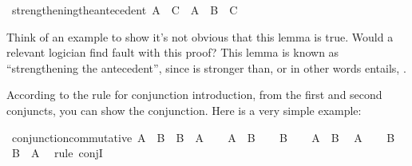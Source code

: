 \begin{isabellebody}
\begin{isamarkuptext}
\end{isamarkuptext}\isamarkuptrue%
\isamarkupfalse%
\ strengthening{\isacharunderscore}the{\isacharunderscore}antecedent{\isacharcolon}\ {\isachardoublequoteopen}{\isacharparenleft}A\ {\isasymlongrightarrow}\ C{\isacharparenright}\ {\isasymlongrightarrow}\ {\isacharparenleft}A\ {\isasymand}\ B\ {\isasymlongrightarrow}\ C{\isacharparenright}{\isachardoublequoteclose}%
\isadelimproof
\ %
\endisadelimproof
%
\isatagproof
{}\isamarkupfalse%
%
\endisatagproof
{\isafoldproof}%
%
\isadelimproof
%
\endisadelimproof
%
\begin{isamarkuptext}%
Think of an example to show it's not obvious that this lemma is true. Would a relevant logician
find fault with this proof? This lemma is known as ``strengthening the antecedent'', since 
is stronger than, or in other words entails, .%
\end{isamarkuptext}\isamarkuptrue%
%
\isadelimdocument
%
\endisadelimdocument
%
\isatagdocument
%
\isamarkuptrue%
%
\endisatagdocument
{\isafolddocument}%
%
\isadelimdocument
%
\endisadelimdocument
%
\begin{isamarkuptext}%
According to the rule for conjunction introduction, from the first and second conjuncts, you
can show the conjunction. Here is a very simple example:%
\end{isamarkuptext}\isamarkuptrue%
\isamarkupfalse%
\ conjunction{\isacharunderscore}commutative{\isacharcolon}\ {\isachardoublequoteopen}A\ {\isasymand}\ B\ {\isasymlongrightarrow}\ B\ {\isasymand}\ A{\isachardoublequoteclose}\isanewline
%
\isadelimproof
%
\endisadelimproof
%
\isatagproof
{}\isamarkupfalse%
\isanewline
\ \ \isamarkupfalse%
\ {\isachardoublequoteopen}A\ {\isasymand}\ B{\isachardoublequoteclose}\isanewline
\ \ \isamarkupfalse%
\ {\isachardoublequoteopen}B{\isachardoublequoteclose}\isacommand{{\isachardot}{\isachardot}}\isamarkupfalse%
\isanewline
\ \ \isamarkupfalse%
\ {\isacharbackquoteopen}A\ {\isasymand}\ B{\isacharbackquoteclose}\ \isamarkupfalse%
\ {\isachardoublequoteopen}A{\isachardoublequoteclose}\isacommand{{\isachardot}{\isachardot}}\isamarkupfalse%
\isanewline
\ \ \isamarkupfalse%
\ {\isacharbackquoteopen}B{\isacharbackquoteclose}\ \isamarkupfalse%
\ {\isachardoublequoteopen}B\ {\isasymand}\ A{\isachardoublequoteclose}\ \isamarkupfalse%
\ {\isacharparenleft}rule\ conjI{\isacharparenright}\isanewline

\end{isabellebody}
